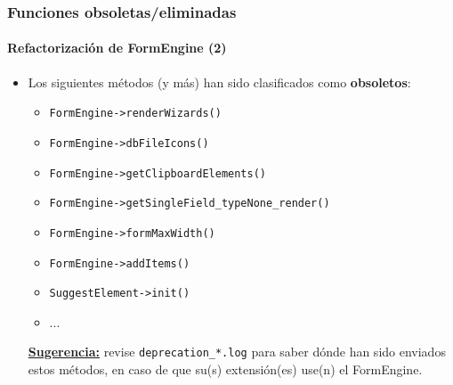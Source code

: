 \begin{frame}[fragile]
	\frametitle{Funciones obsoletas/eliminadas}
	\framesubtitle{Refactorización de FormEngine (2)}

	\begin{itemize}

		\item Los siguientes métodos (y más) han sido clasificados como \textbf{obsoletos}:

			\begin{itemize}
				\item \texttt{FormEngine->renderWizards()}
				\item \texttt{FormEngine->dbFileIcons()}
				\item \texttt{FormEngine->getClipboardElements()}
				\item \texttt{FormEngine->getSingleField\_typeNone\_render()}
				\item \texttt{FormEngine->formMaxWidth()}
				\item \texttt{FormEngine->addItems()}
				\item \texttt{SuggestElement->init()}
				\item ...
			\end{itemize}

		\small
			\underline{\textbf{Sugerencia:}}
			revise \texttt{deprecation\_*.log} para saber dónde han sido enviados 
			estos métodos, en caso de que su(s) extensión(es) use(n) el FormEngine.
		\normalsize

	\end{itemize}

\end{frame}


